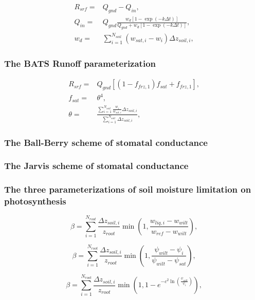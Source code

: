 \documentclass[essd]{copernicus}
\begin{document}
\begin{align}
    R_{srf} = & Q_{gnd} - Q_{in} \text{,} \\
    Q_{in} = & Q_{gnd} \frac{w_d [1-\exp(-k\Delta t)]}{Q_{gnd} + w_d [1 - \exp(-k\Delta t)]} \text{,} \\
    w_d = & \sum_{i=1}^{N_{soil}} (w_{sat,i} - w_i) \Delta z_{soil,i} \text{,}
\end{align}


\subsubsection{The BATS Runoff parameterization}
\begin{align}
    R_{srf} = & Q_{gnd} \left[ (1 - f_{frz,1}) f_{sat} + f_{frz,1} \right] \text{,} \\
    f_{sat} = & \theta^4 \text{,} \\
    \theta = & \frac{\sum_{i=1}^{N_{soil}}\frac{w_i}{w_{sat,i}}\Delta z_{soil,i}}{\sum_{i=1}^{N_{soil}}\Delta z_{soil,i}} \text{,}
\end{align}


\subsubsection{The Ball-Berry scheme of stomatal conductance}


\subsubsection{The Jarvis scheme of stomatal conductance}


\subsubsection{The three parameterizations of soil moisture limitation on photosynthesis}

\begin{equation}
    \beta = \sum_{i=1}^{N_{root}} \frac{\Delta z_{soil,i}}{z_{root}}
    \min\left(1, \frac{w_{liq,i} - w_{wilt}}{w_{ref} - w_{wilt}}\right)
    \text{,}
\end{equation}

\begin{equation}
    \beta = \sum_{i=1}^{N_{root}} \frac{\Delta z_{soil,i}}{z_{root}}
    \min\left(1, \frac{\psi_{wilt} - \psi_{i}}{\psi_{wilt} - \psi_{sat}}\right)
    \text{,}
\end{equation}

\begin{equation}
    \beta = \sum_{i=1}^{N_{root}} \frac{\Delta z_{soil,i}}{z_{root}}
    \min\left(1, 1 - e^{-c^2 \ln\left(\frac{\psi_{wilt}}{\psi_{i}} \right)} \right)
    \text{,}
\end{equation}
\end{document}
